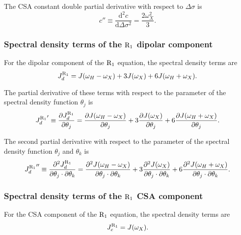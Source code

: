 \noindent The CSA constant double partial derivative with respect to $\Delta\sigma$ is
\begin{equation}
    c'' \equiv \frac{\mathrm{d}^2 c}{\mathrm{d} \Delta\sigma^2} = \frac{2 \omega_X^2}{3}. \label{eq: Ri': c"}
\end{equation}


\subsubsection{Spectral density terms of the $\mathrm{R}_1$ dipolar component}

For the dipolar component of the $\mathrm{R}_1$ equation, the spectral density terms are
\begin{equation}
    J_d^{\mathrm{R}_1} = J(\omega_H - \omega_X) + 3J(\omega_X) + 6J(\omega_H + \omega_X).  \label{eq: J terms: JR1d}
\end{equation}

\noindent The partial derivative of these terms with respect to the parameter of the spectral density function $\theta_j$ is
\begin{equation}
    {J_d^{\mathrm{R}_1}}' \equiv \frac{\partial J_d^{\mathrm{R}_1}}{\partial \theta_j}
        = \frac{\partial J(\omega_H - \omega_X)}{\partial \theta_j}
        + 3 \frac{\partial J(\omega_X)}{\partial \theta_j}
        + 6 \frac{\partial J(\omega_H + \omega_X)}{\partial \theta_j}.  \label{eq: J terms: JR1d'}
\end{equation}

\noindent The second partial derivative with respect to the parameter of the spectral density function $\theta_j$ and $\theta_k$ is
\begin{equation}
    {J_d^{\mathrm{R}_1}}'' \equiv \frac{\partial^2 J_d^{\mathrm{R}_1}}{\partial \theta_j \cdot \partial \theta_k}
        = \frac{\partial^2 J(\omega_H - \omega_X)}{\partial \theta_j \cdot \partial \theta_k}
        + 3 \frac{\partial^2 J(\omega_X)}{\partial \theta_j \cdot \partial \theta_k}
        + 6 \frac{\partial^2 J(\omega_H + \omega_X)}{\partial \theta_j \cdot \partial \theta_k}.  \label{eq: J terms: JR1d"}
\end{equation}


\subsubsection{Spectral density terms of the $\mathrm{R}_1$ CSA component}

For the CSA component of the $\mathrm{R}_1$ equation, the spectral density terms are
\begin{equation}
    J_c^{\mathrm{R}_1} = J(\omega_X).  \label{eq: J terms: JR1c}
\end{equation}

